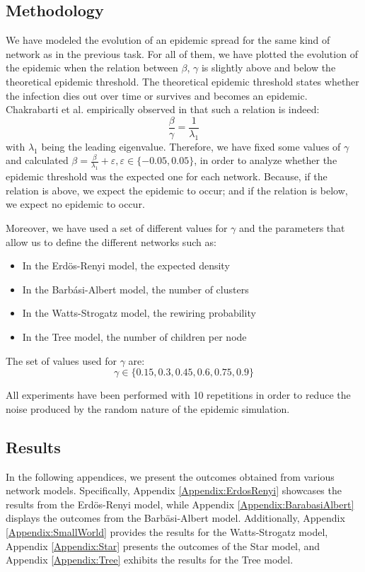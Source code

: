 \subsection{Methodology}
We have modeled the evolution of an epidemic spread for the same kind of network as in the previous task. For all of them, we have plotted the evolution of the epidemic when the relation between $\beta$, $\gamma$ is slightly above and below the theoretical epidemic threshold. The theoretical epidemic threshold states whether the infection dies out over time or survives and becomes an epidemic. Chakrabarti et al. empirically observed in \cite{Chakrabarti2008} that such a relation is indeed: 
$$
    \frac{\beta}{\gamma} = \frac{1}{\lambda_1}
$$
with $\lambda_1$ being the leading eigenvalue. Therefore, we have fixed some values of $\gamma$ and calculated $\beta = \frac{\beta}{\lambda_1} + \varepsilon, \varepsilon\in\{-0.05,0.05\}$, in order to analyze whether the epidemic threshold was the expected one for each network. Because, if the relation is above, we expect the epidemic to occur; and if the relation is below, we expect no epidemic to occur.

Moreover, we have used a set of different values for $\gamma$ and the parameters that allow us to define the different networks such as:
\begin{itemize}
    \item In the Erdös-Renyi model, the expected density
    \item In the Barbási-Albert model, the number of clusters
    \item In the Watts-Strogatz model, the rewiring probability
    \item In the Tree model, the number of children per node
\end{itemize}

The set of values used for $\gamma$ are:
$$
    \gamma \in \{ 0.15, 0.3, 0.45, 0.6, 0.75, 0.9 \}
$$

All experiments have been performed with 10 repetitions in order to reduce the noise produced by the random nature of the epidemic simulation.

\subsection{Results}
In the following appendices, we present the outcomes obtained from various network models. Specifically, Appendix \ref{Appendix:ErdosRenyi} showcases the results from the Erdös-Renyi model, while Appendix \ref{Appendix:BarabasiAlbert} displays the outcomes from the Barbäsi-Albert model. Additionally, Appendix \ref{Appendix:SmallWorld} provides the results for the Watts-Strogatz model, Appendix \ref{Appendix:Star} presents the outcomes of the Star model, and Appendix \ref{Appendix:Tree} exhibits the results for the Tree model.

